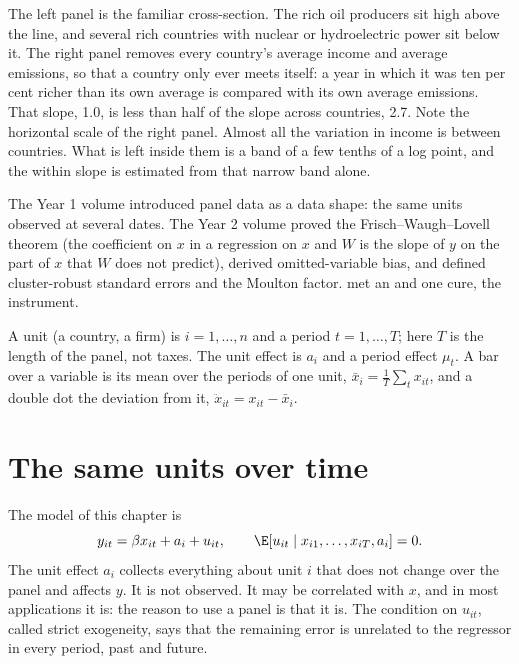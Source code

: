 The left panel is the familiar cross-section. The rich oil producers sit high
above the line, and several rich countries with nuclear or hydroelectric power
sit below it. The right panel removes every country's average income and
average emissions, so that a country only ever meets itself: a year in which
it was ten per cent richer than its own average is compared with its own
average emissions. That slope, 1.0, is less than half of the slope across
countries, 2.7. %
Note the horizontal scale of the right panel. Almost all the variation in
income is between countries. What is left inside them is a band of a few
tenths of a log point, and the within slope is estimated from that narrow
band alone.

\begin{recall}
The Year 1 volume introduced panel data as a data shape: the same units observed
at several dates. The Year 2 volume proved the Frisch--Waugh--Lovell theorem (the
coefficient on $x$ in a regression on $x$ and $W$ is the slope of $y$ on the
part of $x$ that $W$ does not predict), derived omitted-variable bias, and
defined cluster-robust standard errors and the Moulton factor.
 met an  and one cure,
the instrument.
\end{recall}

\begin{notation}\label{not:b3:panel-data:symbols}
A unit (a country, a firm) is $i = 1, \dots, n$ and a period $t = 1, \dots, T$;
here $T$ is the length of the panel, not taxes. The unit effect is $a_i$ and a
period effect $\mu_t$. A bar over a variable is its mean over the periods of
one unit, $\bar x_i = \frac1T \sum_t x_{it}$, and a double dot the deviation
from it, $\ddot x_{it} = x_{it} - \bar x_i$.
\end{notation}

\section{The same units over time}\label{sec:b3:panel-data:units}

The model of this chapter is
\begin{equation}\label{eq:b3:pd:model}
  y_{it} = \beta x_{it} + a_i + u_{it}, \qquad \E[u_{it} \mid x_{i1}, \dots, x_{iT}, a_i] = 0.
\end{equation}
The unit effect $a_i$ collects everything about unit $i$ that does not change
over the panel and affects $y$. It is not observed. It may be correlated with
$x$, and in most applications it is: the reason to use a panel is that it is.
The condition on $u_{it}$, called strict exogeneity, says that the remaining
error is unrelated to the regressor in every period, past and future.

